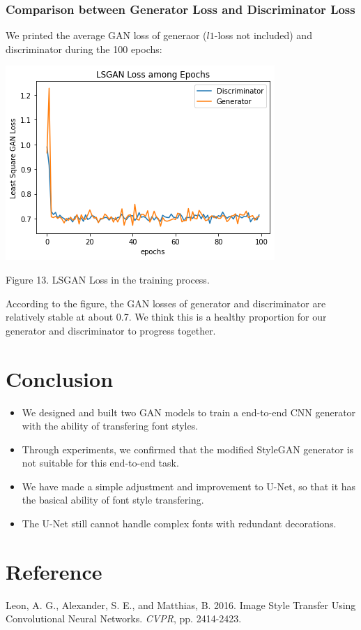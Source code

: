 \documentclass[letterpaper]{article}
\begin{document}
\subsubsection{Comparison between Generator Loss and Discriminator Loss}
We printed the average GAN loss of generaor ($l1$-loss not included) and discriminator during the 100 epochs:

\begin{center}
    \includegraphics[width=.5\textwidth]{./report-fig-gd.png}

    Figure 13. LSGAN Loss in the training process.
\end{center}
According to the figure, the GAN losses of generator and discriminator are relatively stable at about 0.7. We think this is a healthy proportion for our generator and discriminator to progress together.

\section{Conclusion}
\begin{itemize}
    \item We designed and built two GAN models to train a end-to-end CNN generator with the ability of transfering font styles.
    \item Through experiments, we confirmed that the modified StyleGAN generator is not suitable for this end-to-end task.
    \item We have made a simple adjustment and improvement to U-Net, so that it has the basical ability of font style transfering.
    \item The U-Net still cannot handle complex fonts with redundant decorations.
\end{itemize}

\section{Reference}
\smallskip \noindent
Leon, A. G., Alexander, S. E., and Matthias, B. 2016. Image Style Transfer Using Convolutional Neural Networks. \textit{CVPR}, pp. 2414-2423.
\end{document}
